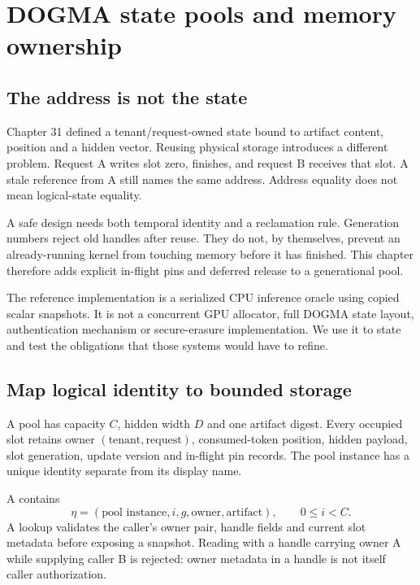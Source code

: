 \chapter{DOGMA state pools and memory ownership}
\label{ch:evo32}
\section{The address is not the state}
Chapter 31 defined a tenant/request-owned state bound to artifact content,
position and a hidden vector. Reusing physical storage introduces a different
problem. Request A writes slot zero, finishes, and request B receives that
slot. A stale reference from A still names the same address. Address equality
does not mean logical-state equality.

A safe design needs both temporal identity and a reclamation rule. Generation
numbers reject old handles after reuse. They do not, by themselves, prevent an
already-running kernel from touching memory before it has finished. This chapter
therefore adds explicit in-flight pins and deferred release to a generational pool.

The reference implementation is a serialized CPU inference oracle using copied
scalar snapshots. It is not a concurrent GPU allocator, full DOGMA state layout,
authentication mechanism or secure-erasure implementation. We use it to state
and test the obligations that those systems would have to refine.

\section{Map logical identity to bounded storage}
A pool has capacity $C$, hidden width $D$ and one artifact digest. Every occupied
slot retains owner $(\text{tenant},\text{request})$, consumed-token position,
hidden payload, slot generation, update version and in-flight pin records.
The pool instance has a unique identity separate from its display name.

A  contains
\[
 \eta=(\text{pool instance},i,g,\text{owner},\text{artifact}),
 \qquad 0\le i<C.
\]
A lookup validates the caller's owner pair, handle fields and current slot
metadata before exposing a snapshot. Reading with a handle carrying owner A
while supplying caller B is rejected: owner metadata in a handle is not itself
caller authorization.

